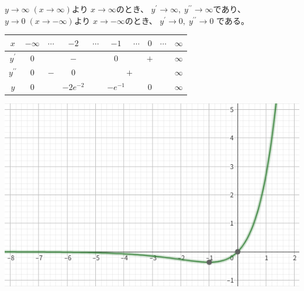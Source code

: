 \documentclass[12pt,b5paper]{ltjsarticle}
\begin{document}
$y\to\infty \; (x\to\infty)$より
$x\to\infty$のとき、
$y^{\prime}\to \infty ,\; y^{\prime\prime}\to \infty$であり、
$y\to0 \; (x\to-\infty)$より
$x\to -\infty$のとき、
$y^{\prime}\to 0 ,\; y^{\prime\prime}\to 0$
である。

\begin{center}
\begin{tabular}{|c||c|c|c|c|c|c|c|c|c|}
 \hline
 $x$ & $-\infty$ & $\cdots$ & $-2$ & $\cdots$ & $-1$ & $\cdots$ & $0$ & $\cdots$ & $\infty$ \\
 \hline
 \hline
 $y^{\prime}$ & $0$ & \multicolumn{3}{|c|}{$-$} & $0$ & \multicolumn{3}{|c|}{$+$} & $\infty$\\
 \hline
 $y^{\prime\prime}$ & $0$ & $-$ & $0$ & \multicolumn{5}{|c|}{$+$} & $\infty$ \\
 \hline
 $y$ & $0$ & & $-2 e^{-2}$ & & $-e^{-1}$ & & $0$ & & $\infty$ \\
 \hline
\end{tabular}
\includegraphics[scale=0.5]{xe^x.png}
\end{center}





\hrulefill
\end{document}
